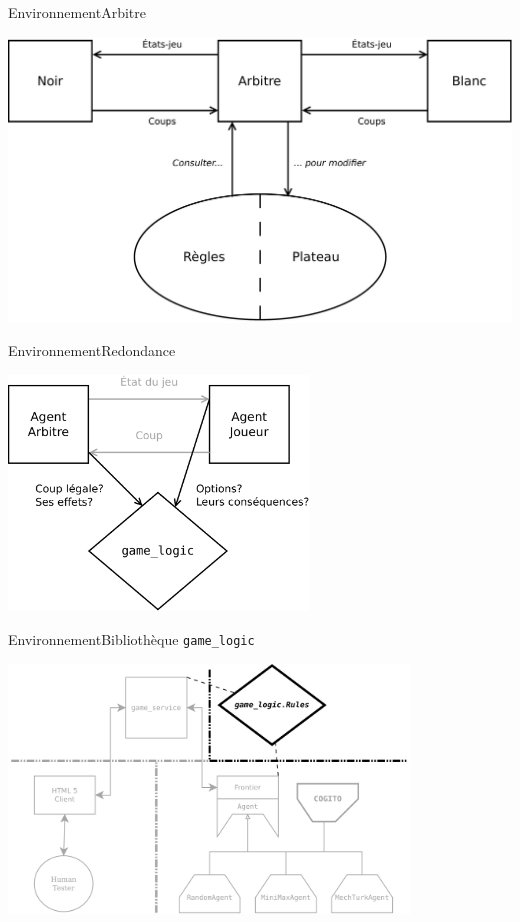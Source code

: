 \begin{frame}{Environnement}{Arbitre}
\begin{center}
\includegraphics[width=\textwidth]{img/william/arbitre}\\
\end{center}
\end{frame}
\begin{frame}{Environnement}{Redondance}
\begin{center}
\includegraphics[width=0.6\textwidth]{img/william/game_logic_shared}\\
\end{center}
\end{frame}
\begin{frame}{Environnement}{Bibliothèque \texttt{game\_logic}}
\begin{center}
\includegraphics[width=0.8\textwidth]{img/william/archi_lib}\\
\end{center}
\end{frame}
